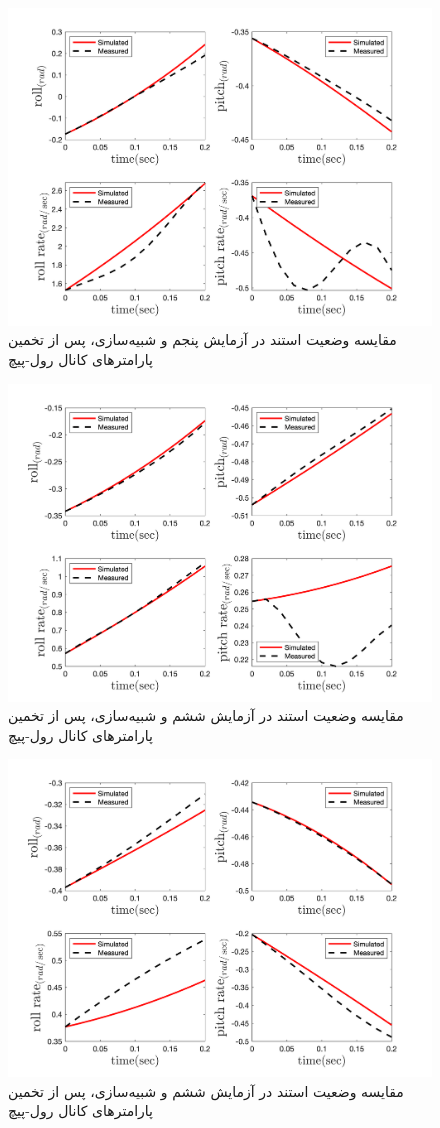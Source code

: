 \begin{figure}[H]
	\includegraphics[width=12cm]{../../Figures/RCP/roll_pitch_parameter_estimation/RCP_roll_pitch_S5.png}
	\centering
	\caption{مقايسه وضعیت استند در  آزمايش پنجم و شبیه‌سازی، پس از تخمین پارامترهای کانال رول-پیچ}
	\label{roll_pitch_ps5}
\end{figure}
\begin{figure}[H]
	\includegraphics[width=12cm]{../../Figures/RCP/roll_pitch_parameter_estimation/RCP_roll_pitch_S6.png}
	\centering
	\caption{مقايسه وضعیت استند در  آزمايش ششم و شبیه‌سازی، پس از تخمین پارامترهای کانال رول-پیچ}
	\label{roll_pitch_ps6}
\end{figure}
\begin{figure}[H]
	\includegraphics[width=12cm]{../../Figures/RCP/roll_pitch_parameter_estimation/RCP_roll_pitch_S7.png}
	\centering
	\caption{مقايسه وضعیت استند در  آزمايش ششم و شبیه‌سازی، پس از تخمین پارامترهای کانال رول-پیچ}
	\label{roll_pitch_ps7}
\end{figure}